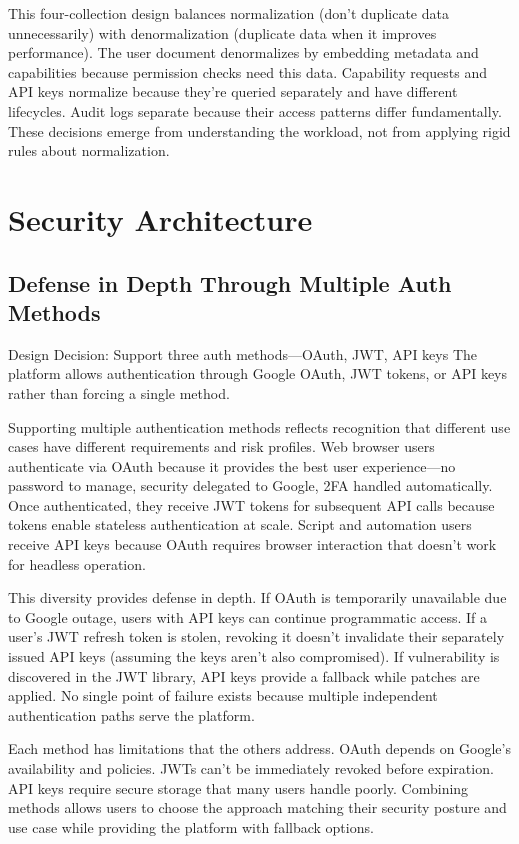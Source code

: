 \documentclass[12pt,a4paper]{article}
\begin{document}
This four-collection design balances normalization (don't duplicate data unnecessarily) with denormalization (duplicate data when it improves performance). The user document denormalizes by embedding metadata and capabilities because permission checks need this data. Capability requests and API keys normalize because they're queried separately and have different lifecycles. Audit logs separate because their access patterns differ fundamentally. These decisions emerge from understanding the workload, not from applying rigid rules about normalization.

\section{Security Architecture}

\subsection{Defense in Depth Through Multiple Auth Methods}

\begin{rationale}{Design Decision: Support three auth methods—OAuth, JWT, API keys}
The platform allows authentication through Google OAuth, JWT tokens, or API keys rather than forcing a single method.
\end{rationale}

Supporting multiple authentication methods reflects recognition that different use cases have different requirements and risk profiles. Web browser users authenticate via OAuth because it provides the best user experience—no password to manage, security delegated to Google, 2FA handled automatically. Once authenticated, they receive JWT tokens for subsequent API calls because tokens enable stateless authentication at scale. Script and automation users receive API keys because OAuth requires browser interaction that doesn't work for headless operation.

This diversity provides defense in depth. If OAuth is temporarily unavailable due to Google outage, users with API keys can continue programmatic access. If a user's JWT refresh token is stolen, revoking it doesn't invalidate their separately issued API keys (assuming the keys aren't also compromised). If vulnerability is discovered in the JWT library, API keys provide a fallback while patches are applied. No single point of failure exists because multiple independent authentication paths serve the platform.

Each method has limitations that the others address. OAuth depends on Google's availability and policies. JWTs can't be immediately revoked before expiration. API keys require secure storage that many users handle poorly. Combining methods allows users to choose the approach matching their security posture and use case while providing the platform with fallback options.
\end{document}
